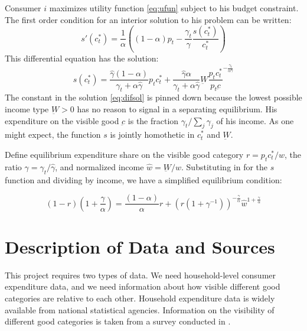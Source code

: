 \documentclass[11pt]{article}
\begin{document}
\begin{CJK}{UTF8}{gbsn}
Consumer $i$ maximizes utility function \eqref{eq:ufun} subject to his budget constraint.  The first order condition for an interior solution to his problem can be written:
\begin{equation}
	\label{foc}
s'(c_t^*) = \frac{1}{\alpha}\left( \left( 1-\alpha\right) p_t - \frac{\gamma_t}{\hat{\gamma}}\frac{s(c_t^*)}{c_t^*}\right)
\end{equation}
This differential equation has the solution:
\begin{equation}
	\label{eq:difsol}
    s(c_t^*) = \frac{\hat{\gamma}\left(1-\alpha\right)}{\gamma_t +\alpha \hat{\gamma}} p_t c_t^* +  \frac{\hat{\gamma} \alpha }{\gamma_t + \alpha \hat{\gamma}} \underbar{W}\frac{p_t c_t^*}{p_t \underbar{c}}^{-\frac{\gamma_t}{\alpha \hat{\gamma}}}
\end{equation}
The constant in the solution \eqref{eq:difsol} is pinned down because the lowest possible income type $\underbar{W} > 0$ has no reason to signal in a separating equilibrium.  His expenditure on the visible good $\underbar{c}$ is the fraction $\gamma_t / \sum_j \gamma_j$ of his income.  As one might expect, the function $s$ is jointly homothetic in $c_t^*$ and $\underbar{W}$.

Define equilibrium expenditure share on the visible good category $r = p_t c_t^* / w$, the ratio $\gamma = \gamma_t / \hat{\gamma}$, and normalized income $\hat{w} = \underbar{W} / w$.  Substituting in for the $s$ function and dividing by income, we have a simplified equilibrium condition:

\begin{equation}
	\label{eq:eq_cond}
    (1 - r)(1 + \frac{\gamma}{\alpha}) = \frac{\left(1-\alpha\right)}{\alpha} r +  \left(r\left(1 + \gamma^{-1}\right)\right)^{-\frac{\gamma}{\alpha}}\hat{w}^{1+\frac{\gamma}{\alpha}}
\end{equation}

\section{Description of Data and Sources}
This project requires two types of data.  We need household-level consumer expenditure data, and we need information about how visible different good categories are relative to each other.  Household expenditure data is widely available from national statistical agencies.  Information on the visibility of different good categories is taken from a survey conducted in \citet{heffetz2011}.


\end{CJK}
\end{document}
